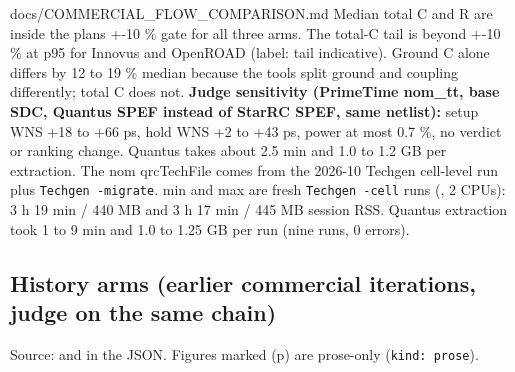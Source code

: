 \begin{relocated}{docs/COMMERCIAL_FLOW_COMPARISON.md}
Median total C and R are inside the plan\textquotesingle s +-10 \% gate
for all three arms. The total-C tail is beyond +-10 \% at p95 for
Innovus and OpenROAD (label: tail indicative). Ground C alone differs by
12 to 19 \% median because the tools split ground and coupling
differently; total C does not. \textbf{Judge sensitivity (PrimeTime
nom\_tt, base SDC, Quantus SPEF instead of StarRC SPEF, same netlist):}
setup WNS +18 to +66 ps, hold WNS +2 to +43 ps, power at most 0.7 \%, no
verdict or ranking change. Quantus takes about 2.5 min and 1.0 to 1.2 GB
per extraction. The nom qrcTechFile comes from the 2026-10 Techgen
cell-level run plus \texttt{Techgen\ -\allowbreak{}migrate}. min and max
are fresh \texttt{Techgen\ -\allowbreak{}cell} runs
(, 2 CPUs): 3 h 19 min / 440 MB and 3 h 17 min
/ 445 MB session RSS. Quantus extraction took 1 to 9 min and 1.0 to 1.25
GB per run (nine runs, 0 errors).

\subsection{History arms (earlier commercial iterations, judge on the
same chain)}\label{tm:pd:commercial-flow-comparison:5-history-arms-earlier-commercial-iterations-judge-on-the-same-chain}

Source:  and  in the JSON.
Figures marked (p) are prose-only (\texttt{kind:\allowbreak{}\ prose}).

\begin{landscape}
\footnotesize\setlength{\tabcolsep}{3pt}


\end{landscape}
\end{relocated}
